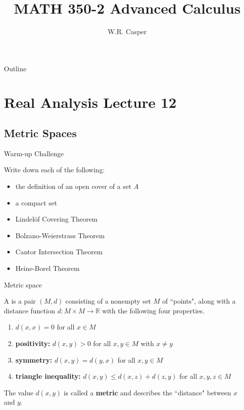 \documentclass{beamer}
\title{MATH 350-2 Advanced Calculus}
\subtitle
{} %
\author[W.R. Casper] %
{W.R. Casper}
\institute[California State University Fullerton] %
{
  Department of Mathematics\\
  California State University Fullerton}
\begin{document}
\begin{frame}
  \titlepage
\end{frame}

\begin{frame}{Outline}
  \tableofcontents
\end{frame}



\section{Real Analysis Lecture 12}
\subsection{Metric Spaces}

\begin{frame}{Warm-up Challenge}
\begin{prob}
Write down each of the following:
\begin{itemize}
\item the definition of an open cover of a set $A$
\pause
\item a compact set
\pause
\item Lindel\"of Covering Theorem
\pause
\item Bolzano-Weierstrass Theorem
\pause
\item Cantor Intersection Theorem
\pause
\item Heine-Borel Theorem
\end{itemize}
\end{prob}
\end{frame}

\begin{frame}{Metric space}
\pause
\begin{defn}
A  is a pair $(M,d)$ consisting of a nonempty set $M$ of ``points", along with a distance function $d: M\times M\rightarrow\mathbb{R}$ with the following four properties.
\pause
\begin{enumerate}[\text{A}1]
\pause
\item $d(x,x) = 0$ for all $x\in M$
\pause
\item \textbf{positivity:}  $d(x,y) > 0$ for all $x,y\in M$ with $x\neq y$
\pause
\item \textbf{symmetry:}  $d(x,y) = d(y,x)$ for all $x,y\in M$
\pause
\item \textbf{triangle inequality:} $d(x,y)\leq d(x,z) + d(z,y)$ for all $x,y,z\in M$
\end{enumerate}
\end{defn}
\pause
The value $d(x,y)$ is called a \textbf{metric} and describes the ``distance" between $x$ and $y$.
\end{frame}
\end{document}
